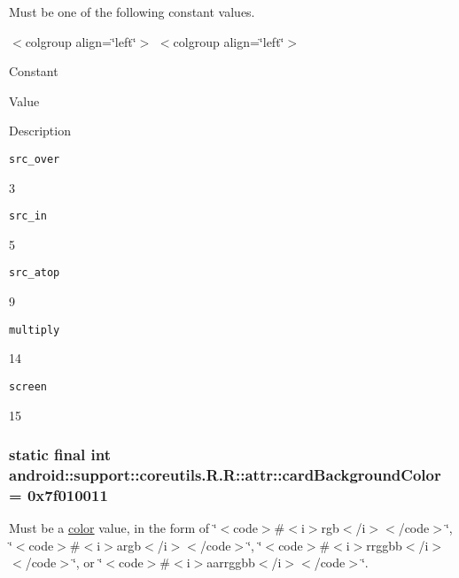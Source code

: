 Must be one of the following constant values. \begin{TabularC}{0}
\hline
\end{TabularC}
$<$colgroup align=\char`\"{}left\char`\"{}$>$ $<$colgroup align=\char`\"{}left\char`\"{}$>$ 

Constant

Value

Description 

{\tt src\_\-over}

3

{\tt src\_\-in}

5

{\tt src\_\-atop}

9

{\tt multiply}

14

{\tt screen}

15\hypertarget{classandroid_1_1support_1_1coreutils_1_1_r_1_1attr_03d6cde875fa875d4e8f29c8b58b12d2}{
\subsubsection[{cardBackgroundColor}]{\setlength{\rightskip}{0pt plus 5cm}static final int android::support::coreutils.R.R::attr::cardBackgroundColor = 0x7f010011}}
\label{classandroid_1_1support_1_1coreutils_1_1_r_1_1attr_03d6cde875fa875d4e8f29c8b58b12d2}


Must be a \hyperlink{classandroid_1_1support_1_1coreutils_1_1_r_1_1color}{color} value, in the form of \char`\"{}$<$code$>$\#$<$i$>$rgb$<$/i$>$$<$/code$>$\char`\"{}, \char`\"{}$<$code$>$\#$<$i$>$argb$<$/i$>$$<$/code$>$\char`\"{}, \char`\"{}$<$code$>$\#$<$i$>$rrggbb$<$/i$>$$<$/code$>$\char`\"{}, or \char`\"{}$<$code$>$\#$<$i$>$aarrggbb$<$/i$>$$<$/code$>$\char`\"{}. 


